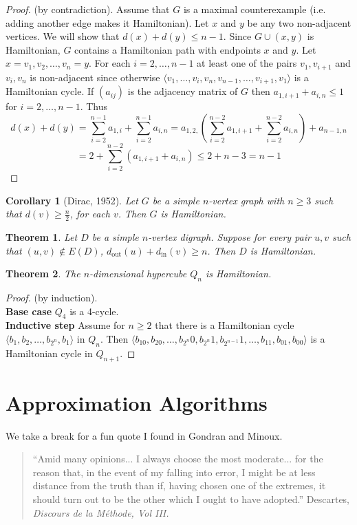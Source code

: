\documentclass{article}
\newtheorem*{thm}{Theorem}
\newtheorem*{cor}{Corollary}
\theoremstyle{definition}
\begin{document}
\begin{proof}
(by contradiction).
Assume that $G$ is a maximal counterexample (i.e. adding another edge makes it Hamiltonian).
Let $x$ and $y$ be any two non-adjacent vertices.
We will show that $d(x) + d(y)  \le n-1$.
Since $G\cup (x,y)$ is Hamiltonian, $G$ contains a Hamiltonian path with endpoints $x$ and $y$.
Let $x = v_1,v_2,\ldots,v_n=y$.
For each $i=2,\ldots,n-1$ at least one of the pairs $v_1,v_{i+1}$ and $v_i,v_n$ is non-adjacent since otherwise $\langle v_1,\ldots,v_i,v_n,v_{n-1},\ldots,v_{i+1},v_1\rangle$ is a Hamiltonian cycle.
If $(a_{ij})$ is the adjacency matrix of $G$ then $a_{1,i+1} + a_{i,n}\le 1$ for $i=2,\ldots,n-1$.
Thus
$$d(x)+d(y) = \sum_{i=2}^{n-1}a_{1,i} + \sum_{i=2}^{n-1} a_{i,n} = a_{1,2,} (\sum_{i=2}^{n-2}a_{1,i+1} + \sum_{i=2}^{n-2} a_{i,n}) + a_{n-1,n} $$
$$= 2 + \sum_{i=2}^{n-2}(a_{1,i+1} +a_{i,n}) \le 2+n-3 = n-1$$
\end{proof}

\begin{cor}[Dirac, 1952]
Let $G$ be a simple $n$-vertex graph with $n\ge 3$ such that $d(v) \ge \frac{n}{2}$, for each $v$.
Then $G$ is Hamiltonian.
\end{cor}

\begin{thm}
Let $D$ be a simple $n$-vertex digraph.
Suppose for every pair $u,v$ such that $(u,v)\not\in E(D)$, $d_{\text{out}}(u) + d_{\text{in}}(v) \ge n$.
Then $D$ is Hamiltonian.
\end{thm}

\begin{thm}
The $n$-dimensional hypercube $Q_n$ is Hamiltonian.
\end{thm}

\begin{proof}
(by induction). \\
\textbf{Base case} $Q_4$ is a 4-cycle. \\
\textbf{Inductive step} Assume for $n\ge 2$ that there is a Hamiltonian cycle $\langle b_1,b_2,\ldots,b_{2^n},b_1\rangle$ in $Q_n$.
Then $\langle b_10,b_20,\ldots,b_{2^n}0,b_{2^n}1,b_{2^{n-1}}1,\ldots,b_11,b_01,b_00\rangle$ is a Hamiltonian cycle in $Q_{n+1}$.
\end{proof}


\section{Approximation Algorithms}
We take a break for a fun quote I found in Gondran and Minoux.
\begin{quotation}
``Amid many opinions... I always choose the most moderate... for the reason that, in the event of my falling into error, I might be at less distance from the truth than if, having chosen one of the extremes, it should turn out to be the other which I ought to have adopted.'' Descartes, \emph{Discours de la M\'ethode, Vol III.}
\end{quotation}
\end{document}
